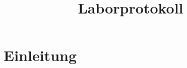 \documentclass[paper=a4, fontsize=11pt, titlepage=true]{scrartcl}
\title{Laborprotokoll}
\begin{document}
\maketitle
\tableofcontents
\clearpage

\section{Einleitung}
\end{document}
